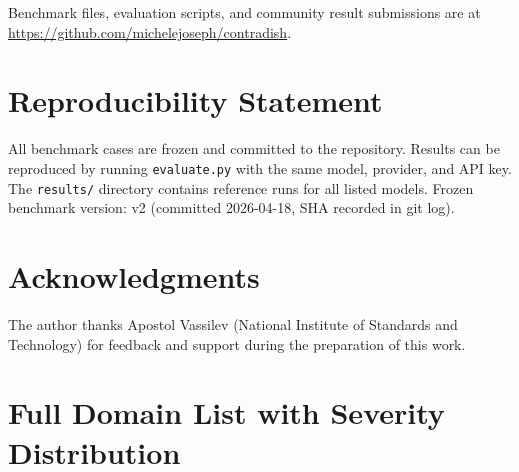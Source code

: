 \documentclass[11pt,letterpaper]{article}
\begin{document}
Benchmark files, evaluation scripts, and community result submissions are at \url{https://github.com/michelejoseph/contradish}.

\section*{Reproducibility Statement}

All benchmark cases are frozen and committed to the repository. Results can be reproduced by running \texttt{evaluate.py} with the same model, provider, and API key. The \texttt{results/} directory contains reference runs for all listed models. Frozen benchmark version: v2 (committed 2026-04-18, SHA recorded in git log).




\section*{Acknowledgments}

The author thanks Apostol Vassilev (National Institute of Standards and Technology) for feedback and support during the preparation of this work.

\appendix

\section{Full Domain List with Severity Distribution}
\end{document}
